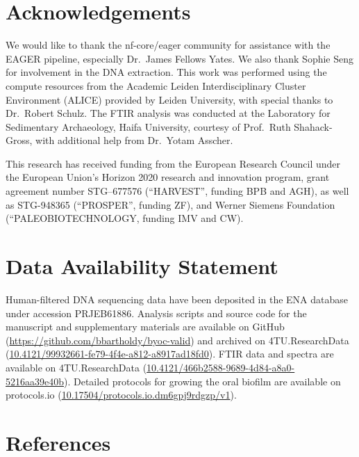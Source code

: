 \documentclass[
]{article}
\begin{document}
\hypertarget{acknowledgements}{%
\section*{Acknowledgements}\label{acknowledgements}}

We would like to thank the nf-core/eager community for assistance with
the EAGER pipeline, especially Dr.~James Fellows Yates. We also thank
Sophie Seng for involvement in the DNA extraction. This work was
performed using the compute resources from the Academic Leiden
Interdisciplinary Cluster Environment (ALICE) provided by Leiden
University, with special thanks to Dr.~Robert Schulz. The FTIR analysis
was conducted at the Laboratory for Sedimentary Archaeology, Haifa
University, courtesy of Prof.~Ruth Shahack-Gross, with additional help
from Dr.~Yotam Asscher.

This research has received funding from the European Research Council
under the European Union's Horizon 2020 research and innovation program,
grant agreement number STG--677576 (``HARVEST'', funding BPB and AGH),
as well as STG-948365 (``PROSPER'', funding ZF), and Werner Siemens
Foundation (``PALEOBIOTECHNOLOGY, funding IMV and CW).

\hypertarget{data-availability-statement}{%
\section*{Data Availability
Statement}\label{data-availability-statement}}

Human-filtered DNA sequencing data have been deposited in the ENA
database under accession PRJEB61886. Analysis scripts and source code
for the manuscript and supplementary materials are available on GitHub
(\url{https://github.com/bbartholdy/byoc-valid}) and archived on
4TU.ResearchData
(\href{https://doi.org/10.4121/99932661-fe79-4f4e-a812-a8917ad18fd0}{10.4121/99932661-fe79-4f4e-a812-a8917ad18fd0}).
FTIR data and spectra are available on 4TU.ResearchData
(\href{https://doi.org/10.4121/466b2588-9689-4d84-a8a0-5216aa39e40b}{10.4121/466b2588-9689-4d84-a8a0-5216aa39e40b}).
Detailed protocols for growing the oral biofilm are available on
protocols.io
(\href{https://dx.doi.org/10.17504/protocols.io.dm6gpj9rdgzp/v1}{10.17504/protocols.io.dm6gpj9rdgzp/v1}).

\hypertarget{references}{%
\section*{References}\label{references}}
\end{document}
